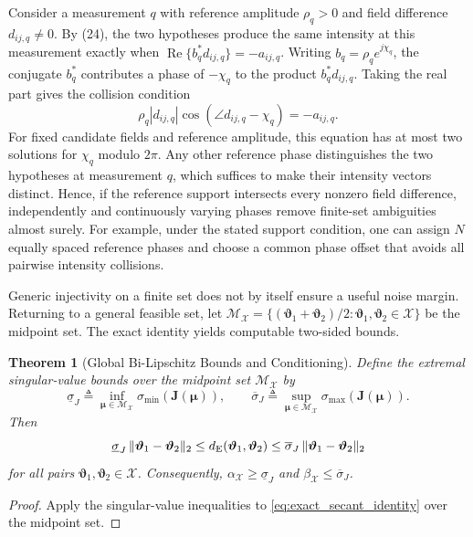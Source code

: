 \documentclass[journal]{IEEEtran}
\newtheorem{theorem}{Theorem}
\begin{document}
Consider a measurement $q$ with reference amplitude $\rho_q>0$ and
field difference $d_{ij,q}\neq 0$. By (24), the two hypotheses produce
the same intensity at this measurement exactly when
$\operatorname{Re}\{b_q^*d_{ij,q}\}=-a_{ij,q}$.
Writing $b_q=\rho_q e^{j\chi_q}$, the conjugate $b_q^*$ contributes
a phase of $-\chi_q$ to the product $b_q^*d_{ij,q}$. Taking the real
part gives the collision condition
\begin{equation}
\rho_q|d_{ij,q}|\cos(\angle d_{ij,q}-\chi_q)=-a_{ij,q}.
\end{equation}
For fixed candidate fields and reference amplitude, this equation
has at most two solutions for $\chi_q$ modulo $2\pi$. Any other
reference phase distinguishes the two hypotheses at measurement $q$,
which suffices to make their intensity vectors distinct. Hence, if the reference support intersects every nonzero field difference, independently and continuously varying phases remove finite-set ambiguities almost surely. For example, under the stated support condition, one can assign $N$
equally spaced reference phases and choose a common phase offset
that avoids all pairwise intensity collisions.

Generic injectivity on a finite set does not by itself ensure a useful noise
margin. Returning to a general feasible set, let
$\mathcal M_{\mathcal X}=\{(\boldsymbol\vartheta_1+
\boldsymbol\vartheta_2)/2:\boldsymbol\vartheta_1,\boldsymbol\vartheta_2\in
\mathcal X\}$ be the midpoint set. The exact identity yields computable
two-sided bounds.

\begin{theorem}[Global Bi-Lipschitz Bounds and Conditioning]
\label{thm:jacobian_bounds}
Define the extremal singular-value bounds over the midpoint set $\mathcal{M}_{\mathcal{X}}$ by
\begin{equation}
\underline\sigma_J
\triangleq\inf_{\boldsymbol\mu\in\mathcal M_{\mathcal X}}
\sigma_{\min}(\mathbf J(\boldsymbol\mu)),\qquad
\overline\sigma_J
\triangleq\sup_{\boldsymbol\mu\in\mathcal M_{\mathcal X}}
\sigma_{\max}(\mathbf J(\boldsymbol\mu)).
\end{equation}
Then
\begin{equation}
\underline\sigma_J\,
\|\boldsymbol\vartheta_1-\boldsymbol\vartheta_2\|_2
\le d_{\rm E}(\boldsymbol\vartheta_1,\boldsymbol\vartheta_2)
\le
\overline\sigma_J\,
\|\boldsymbol\vartheta_1-\boldsymbol\vartheta_2\|_2
\label{eq:global_bilipschitz_bounds}
\end{equation}
for all pairs $\boldsymbol\vartheta_1,\boldsymbol\vartheta_2\in\mathcal X$. Consequently,
$\alpha_{\mathcal X}\ge\underline\sigma_J$ and
$\beta_{\mathcal X}\le\overline\sigma_J$.
\end{theorem}
\begin{proof}
Apply the singular-value inequalities to
\eqref{eq:exact_secant_identity} over the midpoint set.
\end{proof}
\end{document}
